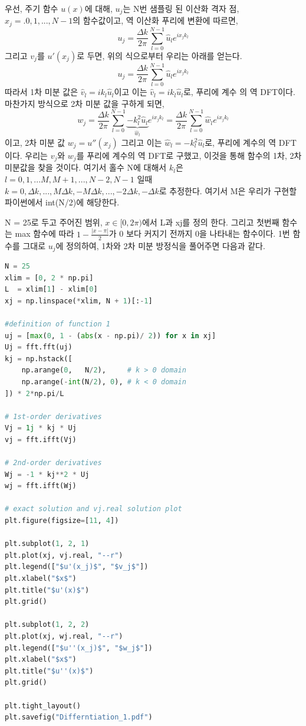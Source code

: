 \documentclass[11pt]{article}
\begin{document}
우선, 주기 함수 $u(x)$에 대해, $u_j$는 N번 샘플링 된 이산화 격자 점, $x_j =.0, 1, ... , N - 1$의 함수값이고, 역 이산화 푸리에 변환에 따르면, 
\begin{equation}
u_j = \frac{\Delta k}{2\pi} \sum_{l = 0}^{N - 1} \hat u_l e^{i x_j k_l}
\end{equation}
그리고 $v_j$를 $u'(x_j)$로 두면, 위의 식으로부터 우리는 아래를 얻는다.
\begin{equation}
u_j = \frac{\Delta k}{2\pi} \sum_{l = 0}^{N - 1} \hat u_l e^{i x_j k_l}
\end{equation}
따라서 1차 미분 값은 $\hat v_l = ik_l\hat u_l$이고 이는 $\hat v_l = ik_l\hat u_l$로,  푸리에 계수  의 역 DFT이다. 마찬가지 방식으로 2차 미분 값을 구하게 되면,
\begin{equation}
w_j = \frac{\Delta k}{2\pi} \sum_{l = 0}^{N - 1}
\underbrace{-k_l^2 \hat u_l}_{\hat w_l}
e^{i x_j k_l}
= \frac{\Delta k}{2\pi} \sum_{l = 0}^{N - 1} \hat w_l e^{i x_j k_l}
\end{equation}
이고, 2차 미분 값 $w_j = u''(x_j)$ 그리고 이는 $\hat w_l = -k_l^2 \hat u_l$로,  푸리에 계수의 역 DFT이다. 우리는 $v_j$와  $w_j$를 푸리에 계수의 역 DFT로 구했고, 이것을 통해 함수의 1차, 2차 미분값을 찾을 것이다. 여기서 홀수 N에 대해서 $k_l$은 $l = 0, 1, ... M, M + 1, ..., N - 2, N - 1$ 일때 $k = 0, \Delta k, ... ,M\Delta k, -M\Delta k, ... , -2\Delta k, -\Delta k$로 추정한다. 여기서 M은 우리가 구현할 파이썬에서 int(N/2)에 해당한다.

N = 25로 두고 주어진 범위, $x \in [0, 2\pi)$에서 L과 xj를 정의 한다. 그리고 첫번째 함수는 max 함수에 따라 $1 - \frac{|x - \pi|}{2}$가 0 보다 커지기 전까지 0을 나타내는 함수이다. 1번 함수를 그대로 $u_j$에 정의하여, 1차와 2차 미분 방정식을 풀어주면 다음과 같다.

\begin{lstlisting}[language=Python]
N = 25
xlim = [0, 2 * np.pi]
L  = xlim[1] - xlim[0]
xj = np.linspace(*xlim, N + 1)[:-1]

#definition of function 1
uj = [max(0, 1 - (abs(x - np.pi)/ 2)) for x in xj]
Uj = fft.fft(uj)
kj = np.hstack([
    np.arange(0,   N/2),     # k > 0 domain
    np.arange(-int(N/2), 0), # k < 0 domain
]) * 2*np.pi/L

# 1st-order derivatives
Vj = 1j * kj * Uj
vj = fft.ifft(Vj)

# 2nd-order derivatives
Wj = -1 * kj**2 * Uj
wj = fft.ifft(Wj)

# exact solution and vj.real solution plot
plt.figure(figsize=[11, 4])

plt.subplot(1, 2, 1)
plt.plot(xj, vj.real, "--r")
plt.legend(["$u'(x_j)$", "$v_j$"])
plt.xlabel("$x$")
plt.title("$u'(x)$")
plt.grid()

plt.subplot(1, 2, 2)
plt.plot(xj, wj.real, "--r")
plt.legend(["$u''(x_j)$", "$w_j$"])
plt.xlabel("$x$")
plt.title("$u''(x)$")
plt.grid()

plt.tight_layout()
plt.savefig("Differntiation_1.pdf")
\end{lstlisting}
\end{document}
